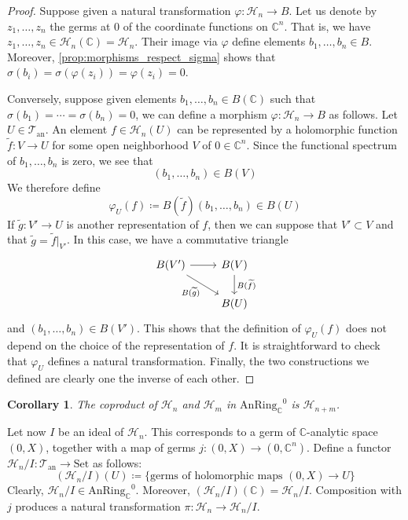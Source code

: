 \documentclass[12pt,a4paper,reqno]{amsart}
\theoremstyle{plain}
\newtheorem{cor}[thm]{Corollary}
\theoremstyle{definition}
\theoremstyle{remark}
\numberwithin{equation}{section}
\begin{document}
\begin{proof}
	Suppose given a natural transformation $\varphi \colon {\mathcal H}_n \to B$.
	Let us denote by $z_1, \ldots, z_n$ the germs at $0$ of the coordinate functions on $\mathbb C^n$. That is, we have $z_1, \ldots, z_n \in {\mathcal H}_n(\mathbb C) = {\mathcal H}_n$.
	Their image via $\varphi$ define elements $b_1, \ldots, b_n \in B$.
	Moreover, \cref{prop:morphisms_respect_sigma} shows that $\sigma(b_i) = \sigma(\varphi(z_i)) = \varphi(z_i) = 0$.
	
	Conversely, suppose given elements $b_1, \ldots, b_n \in B(\mathbb C)$ such that $\sigma(b_1) = \cdots = \sigma(b_n) = 0$, we can define a morphism $\varphi \colon {\mathcal H}_n \to B$ as follows.
	Let $U \in {{\mathcal T}_{\mathrm{an}}}$. An element $f \in {\mathcal H}_n(U)$ can be represented by a holomorphic function $\widetilde{f} \colon V \to U$ for some open neighborhood $V$ of $0 \in \mathbb C^n$.
	Since the functional spectrum of $b_1, \ldots, b_n$ is zero, we see that
	\[ (b_1, \ldots, b_n) \in B(V) \]
	We therefore define
	\[ \varphi_U(f) \coloneqq B(\widetilde{f})(b_1, \ldots, b_n) \in B(U) \]
	If $\widetilde{g} \colon V' \to U$ is another representation of $f$, then we can suppose that $V' \subset V$ and that $\widetilde{g} = \widetilde{f} |_{V'}$.
	In this case, we have a commutative triangle
	\[ \begin{tikzcd}
	B(V') \arrow{r} \arrow{dr}[swap]{B(\widetilde{g})} & B(V) \arrow{d}{B(\widetilde{f})} \\
	& B(U)
	\end{tikzcd} \]
	and $(b_1, \ldots, b_n) \in B(V')$. This shows that the definition of $\varphi_U(f)$ does not depend on the choice of the representation of $f$.
	It is straightforward to check that $\varphi_U$ defines a natural transformation.
	Finally, the two constructions we defined are clearly one the inverse of each other.
\end{proof}

\begin{cor}
	The coproduct of ${\mathcal H}_n$ and ${\mathcal H}_m$ in ${\mathrm{AnRing}_{\mathbb C}}^0$ is ${\mathcal H}_{n + m}$.
\end{cor}

{\ignorespaces}

Let now $I$ be an ideal of ${\mathcal H}_n$.
This corresponds to a germ of {$\mathbb C$-analytic\xspace} space $(0, X)$, together with a map of germs $j \colon (0, X) \to (0, \mathbb C^n)$.
Define a functor ${\mathcal H}_n / I \colon {{\mathcal T}_{\mathrm{an}}} \to {\mathrm{Set}}$ as follows:
\[ ({\mathcal H}_n / I)(U) \coloneqq \{\text{germs of holomorphic maps } (0, X) \to U\} \]
Clearly, ${\mathcal H}_n / I \in {\mathrm{AnRing}_{\mathbb C}}^0$. Moreover, $({\mathcal H}_n /I)(\mathbb C) = {\mathcal H}_n / I$.
Composition with $j$ produces a natural transformation $\pi \colon {\mathcal H}_n \to {\mathcal H}_n / I$.
\end{document}
